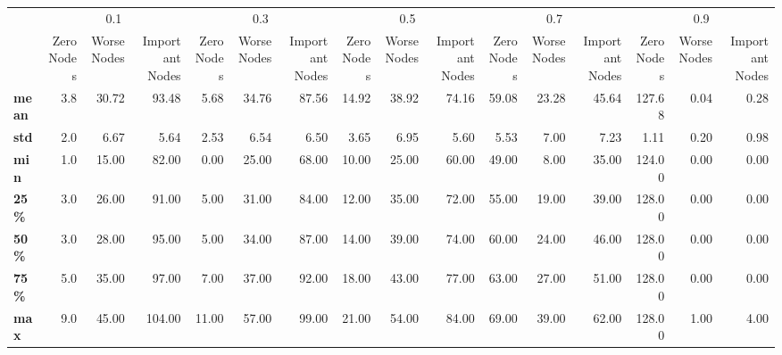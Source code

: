 \begin{tabular}{lrrrrrrrrrrrrrrr}
\toprule
{} & \multicolumn{3}{c}{0.1} & \multicolumn{3}{c}{0.3} & \multicolumn{3}{c}{0.5} & \multicolumn{3}{c}{0.7} & \multicolumn{3}{c}{0.9} \\
{} & Zero Nodes & Worse Nodes & Important Nodes & Zero Nodes & Worse Nodes & Important Nodes & Zero Nodes & Worse Nodes & Important Nodes & Zero Nodes & Worse Nodes & Important Nodes & Zero Nodes & Worse Nodes & Important Nodes \\
\midrule
\textbf{mean} &        3.8 &       30.72 &           93.48 &       5.68 &       34.76 &           87.56 &      14.92 &       38.92 &           74.16 &      59.08 &       23.28 &           45.64 &     127.68 &        0.04 &            0.28 \\
\textbf{std } &        2.0 &        6.67 &            5.64 &       2.53 &        6.54 &            6.50 &       3.65 &        6.95 &            5.60 &       5.53 &        7.00 &            7.23 &       1.11 &        0.20 &            0.98 \\
\textbf{min } &        1.0 &       15.00 &           82.00 &       0.00 &       25.00 &           68.00 &      10.00 &       25.00 &           60.00 &      49.00 &        8.00 &           35.00 &     124.00 &        0.00 &            0.00 \\
\textbf{25\% } &        3.0 &       26.00 &           91.00 &       5.00 &       31.00 &           84.00 &      12.00 &       35.00 &           72.00 &      55.00 &       19.00 &           39.00 &     128.00 &        0.00 &            0.00 \\
\textbf{50\% } &        3.0 &       28.00 &           95.00 &       5.00 &       34.00 &           87.00 &      14.00 &       39.00 &           74.00 &      60.00 &       24.00 &           46.00 &     128.00 &        0.00 &            0.00 \\
\textbf{75\% } &        5.0 &       35.00 &           97.00 &       7.00 &       37.00 &           92.00 &      18.00 &       43.00 &           77.00 &      63.00 &       27.00 &           51.00 &     128.00 &        0.00 &            0.00 \\
\textbf{max } &        9.0 &       45.00 &          104.00 &      11.00 &       57.00 &           99.00 &      21.00 &       54.00 &           84.00 &      69.00 &       39.00 &           62.00 &     128.00 &        1.00 &            4.00 \\
\bottomrule
\end{tabular}
